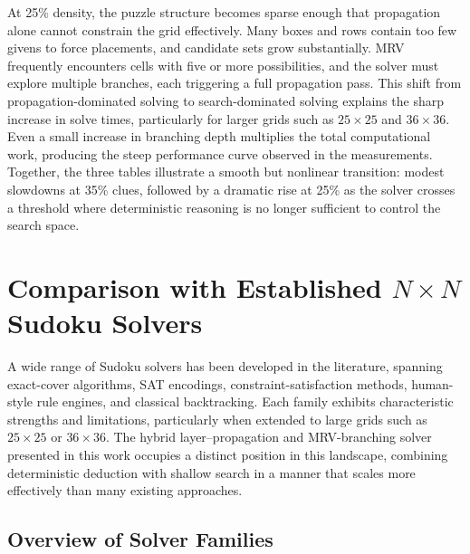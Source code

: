 \documentclass[11pt]{article}
\begin{document}
At 25\% density, the puzzle structure becomes sparse enough that propagation alone cannot constrain the grid effectively. Many boxes and rows contain too few givens to force placements, and candidate sets grow substantially. MRV frequently encounters cells with five or more possibilities, and the solver must explore multiple branches, each triggering a full propagation pass. This shift from propagation-dominated solving to search-dominated solving explains the sharp increase in solve times, particularly for larger grids such as $25 \times 25$ and $36 \times 36$. Even a small increase in branching depth multiplies the total computational work, producing the steep performance curve observed in the measurements. Together, the three tables illustrate a smooth but nonlinear transition: modest slowdowns at 35\% clues, followed by a dramatic rise at 25\% as the solver crosses a threshold where deterministic reasoning is no longer sufficient to control the search space.

\section{Comparison with Established $N \times N$ Sudoku Solvers}

A wide range of Sudoku solvers has been developed in the literature, spanning
exact-cover algorithms, SAT encodings, constraint-satisfaction methods, human-style
rule engines, and classical backtracking. Each family exhibits characteristic
strengths and limitations, particularly when extended to large grids such as
$25 \times 25$ or $36 \times 36$. The hybrid layer--propagation and MRV-branching
solver presented in this work occupies a distinct position in this landscape,
combining deterministic deduction with shallow search in a manner that scales
more effectively than many existing approaches.

\subsection{Overview of Solver Families}
\end{document}

